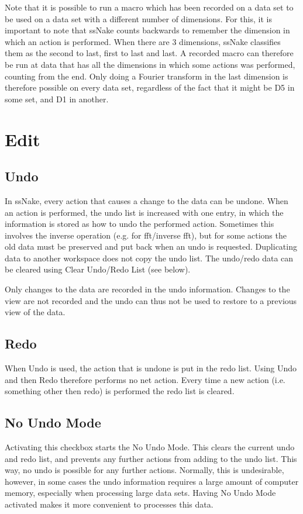 \documentclass[11pt,a4paper]{article}
\begin{document}
Note that it is possible to run a macro which has been recorded on a data set to be used on a data set with a different number of dimensions.
For this, it is important to note that ssNake counts backwards to remember the dimension in which an action is performed. When there are 3 dimensions, ssNake classifies them as the second to last, first to last and last. A recorded macro can therefore be run at data that has all the dimensions in which some actions was performed, counting from the end. Only doing a Fourier transform in the last dimension is therefore possible on every data set, regardless of the fact that it might be D5 in some set, and D1 in another.


\section{Edit}
\subsection{Undo}
In ssNake, every action that causes a change to the data can be undone. When an action is performed, the undo list is increased with one entry, in which the information is stored as how to undo the performed action. Sometimes this involves the inverse operation (e.g. for fft/inverse fft), but for some actions the old data must be preserved and put back when an undo is requested. Duplicating data to another workspace does not copy the undo list. The undo/redo data can be cleared using Clear Undo/Redo List (see below).

Only changes to the data are recorded in the undo information.
Changes to the view are not recorded and the undo can thus not be used to restore to a previous view of the data.

\subsection{Redo}
When Undo is used, the action that is undone is put in the redo list. Using Undo and then Redo therefore performs no net action.
Every time a new action (i.e. something other then redo) is performed the redo list is cleared.

\subsection{No Undo Mode}
Activating this checkbox starts the No Undo Mode. This clears the current undo and redo list, and prevents any further actions from adding to the undo list. This way, no undo is possible for any further actions. Normally, this is undesirable, however, in some cases the undo information requires a large amount of computer memory, especially when processing large data sets.
Having No Undo Mode activated makes it more convenient to processes this data.
\end{document}
